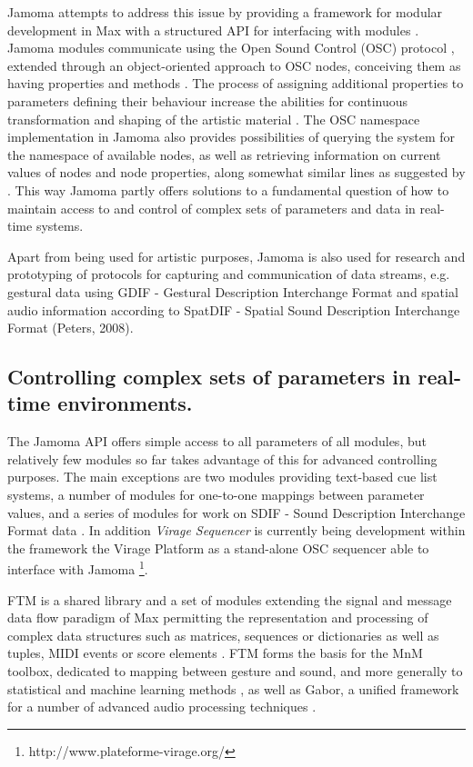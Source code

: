 \documentclass{article}
\begin{document}
Jamoma attempts to address this issue by providing a framework for modular development in Max with a structured API for interfacing with modules \cite{Place:2006jamoma}. Jamoma modules communicate using the Open Sound Control (OSC) protocol \cite{Wright_2002_OSC}, extended through an object-oriented approach to OSC nodes, conceiving them as having properties and methods \cite{Place:2008osc_properties}. The process of assigning additional properties to parameters defining their behaviour increase the abilities for continuous transformation and shaping of the artistic material \cite{Place_2008_flexible_control}. The OSC namespace implementation in Jamoma also provides possibilities of querying the system for the namespace of available nodes, as well as retrieving information on current values of nodes and node properties, along somewhat similar lines as suggested by \cite{Jazzmutant:2006_osc2}. This way Jamoma partly offers solutions to a fundamental question of how to maintain access to and control of complex sets of parameters and data in real-time systems.

Apart from being used for artistic purposes, Jamoma is also used for research and prototyping of protocols for capturing and communication of data streams, e.g. gestural data using GDIF - Gestural Description Interchange Format \cite{Jensenius:2006a, Nymoen_2008_GDIF_sync} and spatial audio information according to SpatDIF - Spatial Sound Description Interchange Format (Peters, 2008).

\subsection{Controlling complex sets of parameters in real-time environments.}\label{sec:intro-complex-control}

The Jamoma  API offers simple access to all parameters of all modules, but relatively few modules so far takes advantage of this for advanced controlling purposes. The main exceptions are two modules providing text-based cue list systems, a number of modules for one-to-one mappings between parameter values, and a series of modules for work on SDIF - Sound Description Interchange Format data \cite{Nymoen_2008_GDIF_sync}. In addition \emph{Virage Sequencer} is currently being development within the framework the Virage Platform as a stand-alone OSC sequencer able to interface with Jamoma \footnote{http://www.plateforme-virage.org/}.

FTM is a shared library and a set of modules extending the signal and message data flow paradigm of Max permitting the representation and processing of complex data structures such as matrices, sequences or dictionaries as well as tuples, MIDI events or score elements \cite{Schnell:2005ftm}. FTM forms the basis for the MnM toolbox, dedicated to mapping between gesture and sound, and more generally to statistical and machine learning methods \cite{Bevilacqua:2005mnm}, as well as Gabor, a unified framework for a number of advanced audio processing techniques \cite{Schnell_2005_Gabor}.
\end{document}
